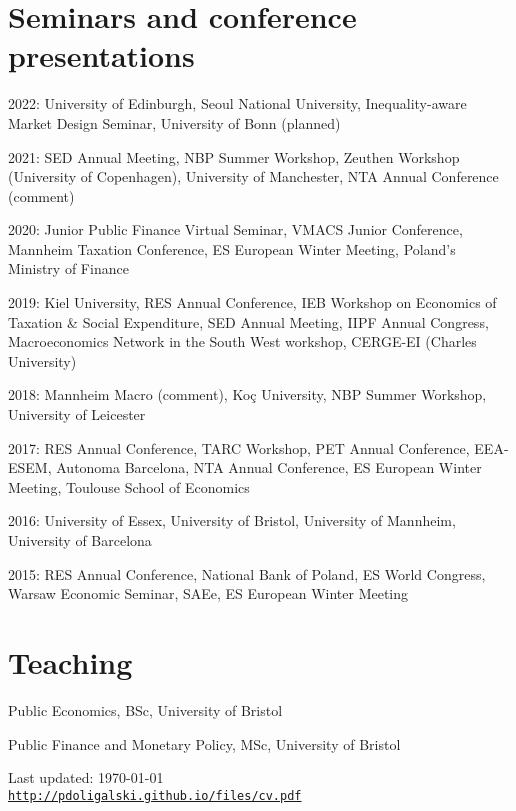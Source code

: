 \documentclass[letterpaper]{article}
\def\footerlink{http://pdoligalski.github.io/files/cv.pdf}
\renewenvironment{itemize}{
  \begin{list}{}{
    \setlength{\leftmargin}{1.5em}
  }
}{
  \end{list}
}
\begin{document}
\section*{Seminars and conference presentations}
\begin{itemize}
  \item 2022: University of Edinburgh, Seoul National University, Inequality-aware Market Design Seminar, University of Bonn (planned)
  \item 2021: SED Annual Meeting, NBP Summer Workshop, Zeuthen Workshop (University of Copenhagen), University of Manchester, NTA Annual Conference (comment) 
  \item 2020: Junior Public Finance Virtual Seminar, VMACS Junior Conference, Mannheim Taxation Conference, ES European Winter Meeting, Poland's Ministry of Finance
  \item 2019: Kiel University, RES Annual Conference, IEB Workshop on Economics of Taxation \& Social Expenditure, SED Annual Meeting, IIPF Annual Congress, Macroeconomics Network in the South West workshop, CERGE-EI (Charles University)
  \item 2018: Mannheim Macro (comment), Ko\c{c} University, NBP Summer Workshop, University of Leicester
  \item 2017: RES Annual Conference, TARC Workshop, PET Annual Conference, EEA-ESEM, Autonoma Barcelona, NTA Annual Conference, ES European Winter Meeting, Toulouse School of Economics
  \item 2016: University of Essex, University of Bristol, University of Mannheim, University of Barcelona
  \item 2015: RES Annual Conference, National Bank of Poland, ES World Congress, Warsaw Economic Seminar, SAEe, ES European Winter Meeting
\end{itemize}

\section*{Teaching}
\begin{itemize}
  \item Public Economics, BSc, University of Bristol
  \item Public Finance and Monetary Policy, MSc, University of Bristol
\end{itemize}

\bigskip

\begin{center}
  \begin{footnotesize}
    Last updated: \today \\
    \href{\footerlink}{\texttt{\footerlink}}
  \end{footnotesize}
\end{center}
\end{document}

